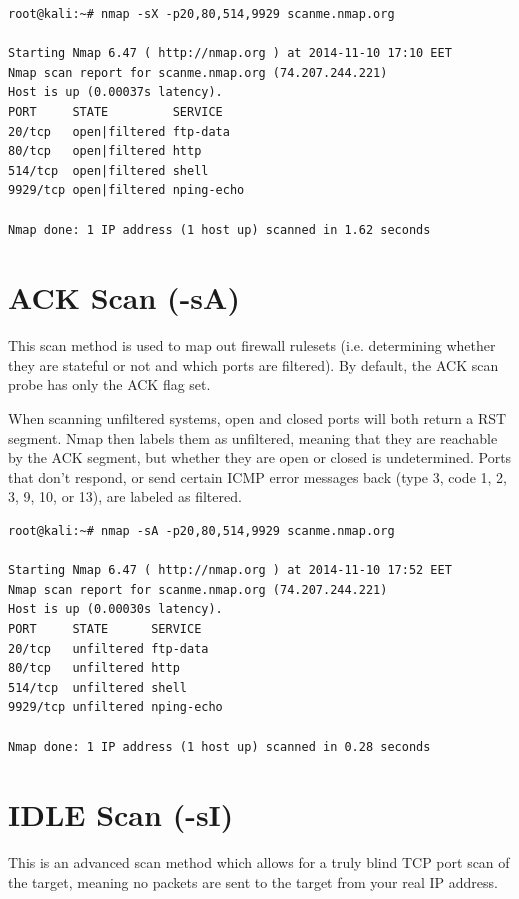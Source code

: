 \documentclass[a4paper,oneside,12pt]{book}
\begin{document}
\begin{lstlisting}[title=A sample Nmap scan using the Xmas Scan option]
root@kali:~# nmap -sX -p20,80,514,9929 scanme.nmap.org

Starting Nmap 6.47 ( http://nmap.org ) at 2014-11-10 17:10 EET
Nmap scan report for scanme.nmap.org (74.207.244.221)
Host is up (0.00037s latency).
PORT     STATE         SERVICE
20/tcp   open|filtered ftp-data
80/tcp   open|filtered http
514/tcp  open|filtered shell
9929/tcp open|filtered nping-echo

Nmap done: 1 IP address (1 host up) scanned in 1.62 seconds
\end{lstlisting}

\section{ACK Scan (-sA)}

This scan method is used to map out firewall rulesets (i.e. determining whether they are stateful or not and which ports are filtered). By default, the ACK scan probe has only the ACK flag set. 

When scanning unfiltered systems, open and closed ports will both return a RST segment. Nmap then labels them as unfiltered, meaning that they are reachable by the ACK segment, but whether they are open or closed is undetermined. Ports that don't respond, or send certain ICMP error messages back (type 3, code 1, 2, 3, 9, 10, or 13), are labeled as filtered.

\begin{lstlisting}[title=A sample Nmap scan using the ACK Scan option]
root@kali:~# nmap -sA -p20,80,514,9929 scanme.nmap.org

Starting Nmap 6.47 ( http://nmap.org ) at 2014-11-10 17:52 EET
Nmap scan report for scanme.nmap.org (74.207.244.221)
Host is up (0.00030s latency).
PORT     STATE      SERVICE
20/tcp   unfiltered ftp-data
80/tcp   unfiltered http
514/tcp  unfiltered shell
9929/tcp unfiltered nping-echo

Nmap done: 1 IP address (1 host up) scanned in 0.28 seconds
\end{lstlisting}

\section{IDLE Scan (-sI)}

This is an advanced scan method which allows for a truly blind TCP port scan of the target, meaning no packets are sent to the target from your real IP address.
\end{document}
